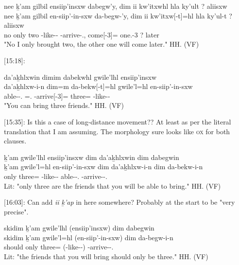 \begin{exe}
    \ex \glll
    nee ḵ'am gilbil ensiip'insxw dabegw'y, dim ii kw'itxwhl hla ky'ult  ? aliisxw \\
    nee ḵ'am gilbil en-siip'-in-sxw da-begw-'y, dim ii kw'itxw[-t]=hl hla ky'ul-t ? aliisxw\\
    no only two  \Nmlz{}-like--\Antip{} \Com{}-arrive-\Fsg{}.\Ii{}, \Prosp{} \Ccnj{} come[-3]=\Cn{} \Part{} one.\Hum{}-3 ? later\\
    \glt "No I only brought two, the other one will come later." \hfill HH.\ElicitationDate{} (VF)
\end{exe}

[15:18]:

\begin{exe}
    \ex \glll
    da'aḵhlxwin dimim dabekwhl gwile'lhl ensiip'insxw \\
    da'aḵhlxw-i-n dim=m da-bekw[-t]=hl gwile'l=hl en-siip'-in-sxw\\
    able-\Tr{}-\Ssg{}.\Ii{} \Prosp{}=\Ssg{}.\I{} \Com{}-arrive[-3]=\Cn{} three=\Cn{} \Nmlz{}-like--\Antip{} \\
    \glt "You can bring three friends." \hfill HH.\ElicitationDate{} (VF)
\end{exe}

[15:35]: Is this a case of long-distance movement?? At least as per the literal translation that I am assuming. The morphology sure looks like \textsc{ox} for both clauses.

\begin{exe}
    \ex \glll
    ḵ'am gwile'lhl ensiip'insxw dim da'aḵhlxwin dim dabegwin \\
    ḵ'am gwile'l=hl en-siip'-in-sxw dim da'aḵhlxw-i-n dim da-bekw-i-n\\
    only three=\Cn{} \Nmlz{}-like--\Antip{} \Prosp{} able-\Tr{}-\Ssg{}.\Ii{} \Prosp{} \Com{}-arrive-\Tr{}-\Ssg{}.\Ii{}  \\
    \glt Lit: "only three are the friends that you will be able to bring." \hfill HH.\ElicitationDate{} (VF)
\end{exe}

[16:03]: Can add \textit{ii ḵ'ap} in here somewhere? Probably at the start to be "very precise".

\begin{exe}
    \ex \glll
    skidim ḵ'am gwile'lhl (ensiip'insxw) dim dabegwin \\
    skidim ḵ'am gwile'l=hl (en-siip'-in-sxw) dim da-begw-i-n\\
    should only three=\Cn{} (\Nmlz{}-like--\Antip{}) \Prosp{} \Com{}-arrive-\Tr{}-\Ssg{}.\Ii{} \\
    \glt Lit: "the friends that you will bring should only be three." \hfill HH.\ElicitationDate{} (VF)
\end{exe}

